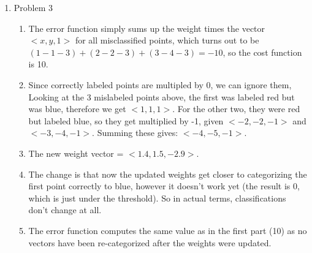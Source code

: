 \documentclass{article}
\begin{document}
\begin{enumerate}
	\item Problem 3
	
	\begin{enumerate}
		\item The error function simply sums up the weight times the vector $<x, y, 1>$ for all misclassified points, which turns out to be $(1 - 1 - 3) + (2 - 2 - 3) + (3 - 4 - 3) = -10$, so the cost function is 10.
		
		\item Since correctly labeled points are multipled by 0, we can ignore them,  Looking at the 3 mislabeled points above, the first was labeled red but was blue, therefore we get $<1, 1, 1>$.  For the other two, they were red but labeled blue, so they get multiplied by -1, given $<-2, -2, -1>$ and $<-3, -4, -1>$.  Summing these gives: $<-4, -5, -1>$.
		
		\item The new weight vector = $<1.4, 1.5, -2.9>$.
		
		\item The change is that now the updated weights get closer to categorizing the first point correctly to blue, however it doesn't work yet (the result is 0, which is just under the threshold).  So in actual terms, classifications don't change at all.
		
		\item The error function computes the same value as in the first part (10) as no vectors have been re-categorized after the weights were updated.
	\end{enumerate}
	
	\end{enumerate}
\end{document}
